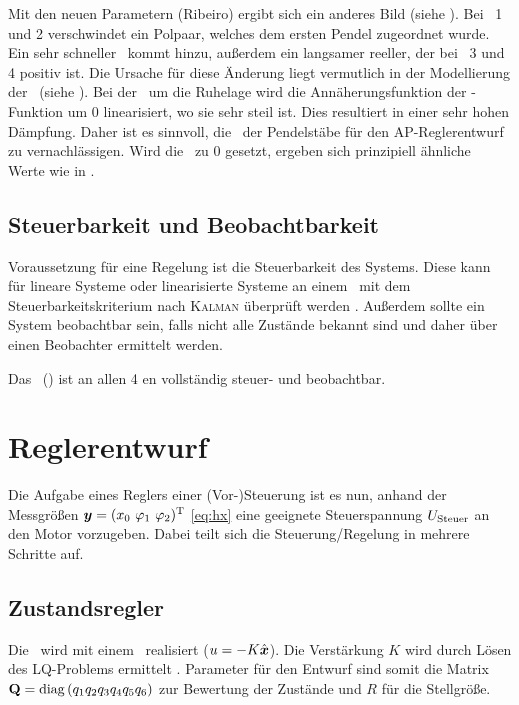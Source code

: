 Mit den neuen Parametern (Ribeiro) ergibt sich ein anderes Bild (siehe ).
Bei \ap\ 1 und 2 verschwindet ein Polpaar, welches dem ersten Pendel zugeordnet wurde. Ein sehr schneller \ew\ kommt hinzu, außerdem ein langsamer reeller, der bei \ap\ 3 und 4 positiv ist. 
Die Ursache für diese Änderung liegt vermutlich in der Modellierung der \crb\ (siehe ). Bei der \lin\ um die Ruhelage wird die Annäherungsfunktion der -Funktion um 0 linearisiert, wo sie sehr steil ist. Dies resultiert in einer sehr hohen Dämpfung. Daher ist es sinnvoll, die \crb\ der Pendelstäbe für den AP-Reglerentwurf zu vernachlässigen.
Wird die \crb\ zu 0 gesetzt, ergeben sich prinzipiell ähnliche Werte wie in .


\subsection{Steuerbarkeit und Beobachtbarkeit}

Voraussetzung für eine Regelung ist die Steuerbarkeit des Systems. Diese kann für lineare Systeme oder linearisierte Systeme an einem \ap\ mit dem Steuerbarkeitskriterium nach \textsc{Kalman} überprüft werden \cite{AdamyRT2}. Außerdem sollte ein System beobachtbar sein, falls nicht alle Zustände bekannt sind und daher über einen Beobachter ermittelt werden.

Das \spds\ (\bss) ist an allen 4 \ap en vollständig steuer- und beobachtbar.


\section{Reglerentwurf}

Die Aufgabe eines Reglers \bzw einer (Vor-)Steuerung ist es nun, anhand der Messgrößen $\vey=(\xo\ \phe\ \phz)^{\transp}$ \eqref{eq:hx} eine geeignete Steuerspannung $U_{\mathrm{Steuer}}$ an den Motor vorzugeben. Dabei teilt sich die Steuerung/Regelung in mehrere Schritte auf. 


\subsection{Zustandsregler}

Die \aprg\ wird mit einem \zsr\ realisiert ($u=-K \hat{\boldsymbol{x}}$). Die Verstärkung $K$ wird durch Lösen des LQ-Problems ermittelt \cite{AdamyRT2}. Parameter für den Entwurf sind somit die Matrix ${\boldsymbol{\mathrm{Q}}}=\mathrm{diag} \, (q_1  q_2  q_3  q_4  q_5  q_6)$ zur Bewertung der Zustände und $R$ für die Stellgröße. 

